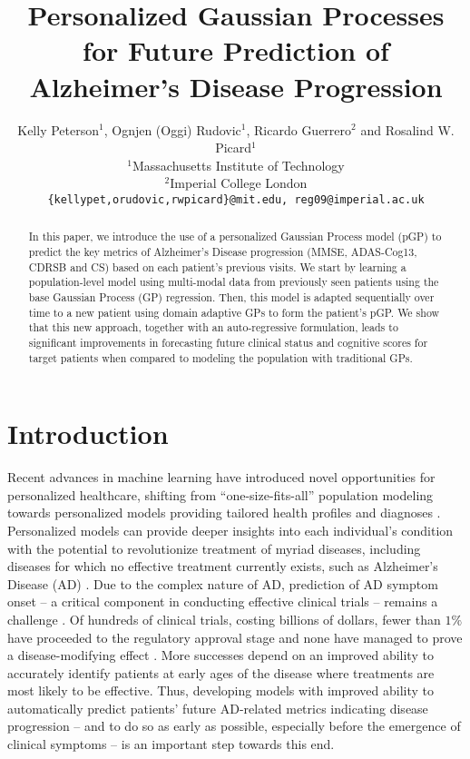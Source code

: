 \documentclass{article}
\title{Personalized Gaussian Processes for Future Prediction of Alzheimer's Disease Progression }
\author{
  Kelly Peterson$^1$,  Ognjen (Oggi) Rudovic$^1$, Ricardo Guerrero$^2$ and Rosalind W. Picard$^1$\\
  $^1$Massachusetts Institute of Technology\\
  $^2$Imperial College London\\
  {\tt\small \{kellypet,orudovic,rwpicard\}@mit.edu, reg09@imperial.ac.uk}
}
\begin{document}

\maketitle
\begin{abstract}
In this paper, we introduce the use of a personalized Gaussian Process model (pGP) to predict the key metrics of Alzheimer's Disease progression (MMSE, ADAS-Cog13, CDRSB and CS) based on each patient's previous visits. We start by learning a population-level model using multi-modal data from previously seen patients using the base Gaussian Process (GP) regression. Then, this model is adapted sequentially over time to a new patient using domain adaptive GPs to form the patient's pGP. We show that this new approach, together with an auto-regressive formulation, leads to significant improvements in forecasting future clinical status and cognitive scores for target patients when compared to modeling the population with traditional GPs. 
\end{abstract}

\section{Introduction}

Recent advances in machine learning have introduced novel opportunities for personalized healthcare, shifting from ``one-size-fits-all'' population modeling towards personalized models providing tailored health profiles and diagnoses \cite{Toschi2016, deyati2013,simmons2012}. Personalized models can provide deeper insights into each individual's condition with the potential to revolutionize treatment of myriad diseases, including diseases for which no effective treatment currently exists, such as Alzheimer’s Disease (AD) \cite{tadpole2017,mueller2005,jack2008,schelterns2003}. 
Due to the complex nature of AD, prediction of AD symptom onset -- a critical component in conducting effective clinical trials -- remains a challenge \cite{mangialasche2010,cummings2006,schelterns2003}. Of hundreds of clinical trials, costing billions of dollars, fewer than $1\%$ have proceeded to the regulatory approval stage and none have managed to prove a disease-modifying effect \citep{tadpole2017,cummings2006}. More successes depend on an improved ability to accurately identify patients at early ages of the disease where treatments are most likely to be effective. Thus, developing models with improved ability to automatically predict patients' future AD-related metrics indicating disease progression -- and to do so as early as possible, especially before the emergence of clinical symptoms -- is an important step towards this end.
\end{document}
